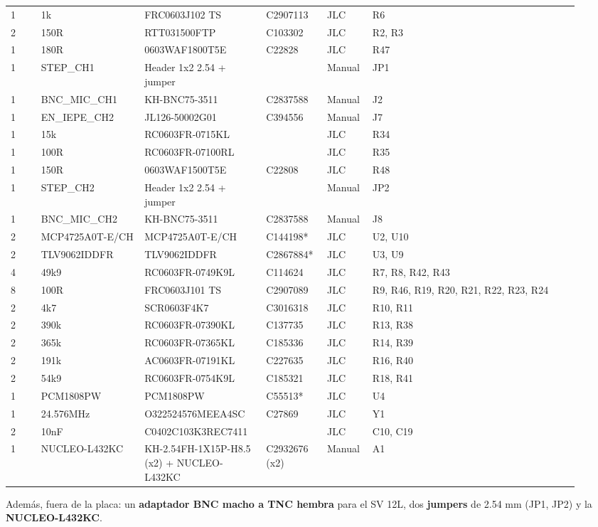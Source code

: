 \documentclass[10pt,a4paper]{article}
\begin{document}
{\begin{longtable}{@{}L{0.05\linewidth}L{0.17\linewidth}L{0.2\linewidth}L{0.1\linewidth}L{0.07\linewidth}L{0.34\linewidth}@{}}
1 & 1k & FRC0603J102 TS & C2907113 & JLC & R6\\
2 & 150R & RTT031500FTP & C103302 & JLC & R2, R3\\
1 & 180R & 0603WAF1800T5E & C22828 & JLC & R47\\
1 & STEP\_\allowbreak{}CH1 & Header 1x2 2.54 + jumper &  & Manual & JP1\\
1 & BNC\_\allowbreak{}MIC\_\allowbreak{}CH1 & KH-BNC75-3511 & C2837588 & Manual & J2\\
1 & EN\_\allowbreak{}IEPE\_\allowbreak{}CH2 & JL126-50002G01 & C394556 & Manual & J7\\
1 & 15k & RC0603FR-0715KL &  & JLC & R34\\
1 & 100R & RC0603FR-07100RL &  & JLC & R35\\
1 & 150R & 0603WAF1500T5E & C22808 & JLC & R48\\
1 & STEP\_\allowbreak{}CH2 & Header 1x2 2.54 + jumper &  & Manual & JP2\\
1 & BNC\_\allowbreak{}MIC\_\allowbreak{}CH2 & KH-BNC75-3511 & C2837588 & Manual & J8\\
2 & MCP4725A0T-E/CH & MCP4725A0T-E/CH & C144198* & JLC & U2, U10\\
2 & TLV9062IDDFR & TLV9062IDDFR & C2867884* & JLC & U3, U9\\
4 & 49k9 & RC0603FR-0749K9L & C114624 & JLC & R7, R8, R42, R43\\
8 & 100R & FRC0603J101 TS & C2907089 & JLC & R9, R46, R19, R20, R21, R22, R23, R24\\
2 & 4k7 & SCR0603F4K7 & C3016318 & JLC & R10, R11\\
2 & 390k & RC0603FR-07390KL & C137735 & JLC & R13, R38\\
2 & 365k & RC0603FR-07365KL & C185336 & JLC & R14, R39\\
2 & 191k & AC0603FR-07191KL & C227635 & JLC & R16, R40\\
2 & 54k9 & RC0603FR-0754K9L & C185321 & JLC & R18, R41\\
1 & PCM1808PW & PCM1808PW & C55513* & JLC & U4\\
1 & 24.576MHz & O322524576MEEA4SC & C27869 & JLC & Y1\\
2 & 10nF & C0402C103K3REC7411 &  & JLC & C10, C19\\
1 & NUCLEO-L432KC & KH-2.54FH-1X15P-H8.5 (x2) + NUCLEO-L432KC & C2932676 (x2) & Manual & A1\\
\bottomrule\end{longtable}}
Además, fuera de la placa: un \textbf{adaptador BNC macho a TNC hembra} para el SV 12L, dos
\textbf{jumpers} de 2.54 mm (JP1, JP2) y la \textbf{NUCLEO-L432KC}.
\end{document}
